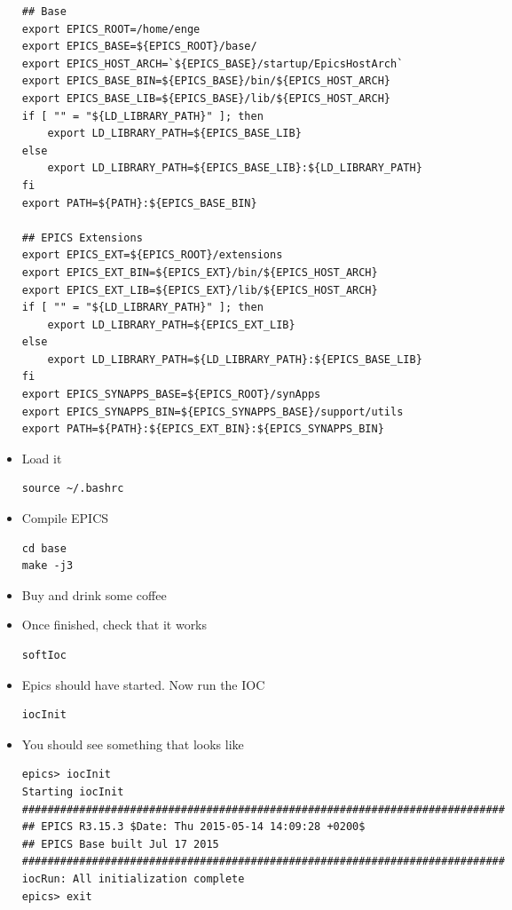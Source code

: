 \documentclass[11pt]{article}
\begin{document}
\begin{itemize}
\begin{verbatim}
## Base
export EPICS_ROOT=/home/enge
export EPICS_BASE=${EPICS_ROOT}/base/
export EPICS_HOST_ARCH=`${EPICS_BASE}/startup/EpicsHostArch`
export EPICS_BASE_BIN=${EPICS_BASE}/bin/${EPICS_HOST_ARCH}
export EPICS_BASE_LIB=${EPICS_BASE}/lib/${EPICS_HOST_ARCH}
if [ "" = "${LD_LIBRARY_PATH}" ]; then
    export LD_LIBRARY_PATH=${EPICS_BASE_LIB}
else
    export LD_LIBRARY_PATH=${EPICS_BASE_LIB}:${LD_LIBRARY_PATH}
fi
export PATH=${PATH}:${EPICS_BASE_BIN}

## EPICS Extensions
export EPICS_EXT=${EPICS_ROOT}/extensions
export EPICS_EXT_BIN=${EPICS_EXT}/bin/${EPICS_HOST_ARCH}
export EPICS_EXT_LIB=${EPICS_EXT}/lib/${EPICS_HOST_ARCH}
if [ "" = "${LD_LIBRARY_PATH}" ]; then
    export LD_LIBRARY_PATH=${EPICS_EXT_LIB}
else
    export LD_LIBRARY_PATH=${LD_LIBRARY_PATH}:${EPICS_BASE_LIB}
fi
export EPICS_SYNAPPS_BASE=${EPICS_ROOT}/synApps
export EPICS_SYNAPPS_BIN=${EPICS_SYNAPPS_BASE}/support/utils
export PATH=${PATH}:${EPICS_EXT_BIN}:${EPICS_SYNAPPS_BIN}
\end{verbatim}
\item Load it
\begin{verbatim}
source ~/.bashrc
\end{verbatim}
\item Compile EPICS
\begin{verbatim}
cd base
make -j3
\end{verbatim}
\item Buy and drink some coffee
\item Once finished, check that it works
\begin{verbatim}
softIoc
\end{verbatim}
\item Epics should have started. Now run the IOC
\begin{verbatim}
iocInit
\end{verbatim}
\item You should see something that looks like
\begin{verbatim}
epics> iocInit  
Starting iocInit
############################################################################
## EPICS R3.15.3 $Date: Thu 2015-05-14 14:09:28 +0200$
## EPICS Base built Jul 17 2015
############################################################################
iocRun: All initialization complete
epics> exit
\end{verbatim}
\end{itemize}
\end{document}

